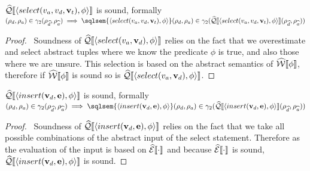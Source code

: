 \begin{conjecture}\label{thm:sound-select}
    $\widehat{\mathcal{Q}}\llbracket \langle select(v_a, v_d, \mathbf{v}_t), \phi \rangle \rrbracket$ is sound, formally $(\rho_d, \rho_a) \in \concrete_2(\rho_{\ab{d}}, \rho_{\ab{a}}) \implies \sqlsem{\langle select(v_a, v_d, \mathbf{v}_t), \phi \rangle}(\rho_d, \rho_a) \in \concrete_2(\abssqlsem{\langle select(v_a, v_d, \mathbf{v}_t), \phi \rangle}(\rho_{\ab{d}}, \rho_{\ab{a}}))$
\end{conjecture}
\begin{proof}
    \pfsketch\
    Soundness of $\widehat{\mathcal{Q}}\llbracket \langle select(v_a, \mathbf{v}_d), \phi \rangle \rrbracket$ relies on the fact that we overestimate and select abstract tuples where we know the predicate $\phi$ is true, and also those where we are unsure.
    This selection is based on the abstract semantics of $\widehat{\mathcal{W}}\llbracket \phi \rrbracket$, therefore if $\widehat{\mathcal{W}}\llbracket \phi \rrbracket$ is sound so is $\widehat{\mathcal{Q}}\llbracket \langle select(v_a, \mathbf{v}_d), \phi \rangle \rrbracket$.
\end{proof}

\begin{conjecture}\label{thm:sound-insert}
    $\widehat{\mathcal{Q}}\llbracket \langle insert(\mathbf{v}_d, \mathbf{e}), \phi \rangle \rrbracket$ is sound, formally $(\rho_d, \rho_a) \in \concrete_2(\rho_{\ab{d}}, \rho_{\ab{a}}) \implies \sqlsem{\langle insert(\mathbf{v}_d, \mathbf{e}), \phi \rangle}(\rho_d, \rho_a) \in \concrete_2(\abssqlsem{\langle insert(\mathbf{v}_d, \mathbf{e}), \phi \rangle}(\rho_{\ab{d}}, \rho_{\ab{a}}))$
\end{conjecture}
\begin{proof}
    \pfsketch\
    Soundness of $\widehat{\mathcal{Q}}\llbracket \langle insert(\mathbf{v}_d, \mathbf{e}), \phi \rangle \rrbracket$ relies on the fact that we take all possible combinations of the abstract input of the select statement.
    Therefore as the evaluation of the input is based on $\widehat{\mathcal{E}}\llbracket \cdot \rrbracket$ and because $\widehat{\mathcal{E}}\llbracket \cdot \rrbracket$ is sound, $\widehat{\mathcal{Q}}\llbracket \langle insert(\mathbf{v}_d, \mathbf{e}), \phi \rangle \rrbracket$ is sound.
\end{proof}

